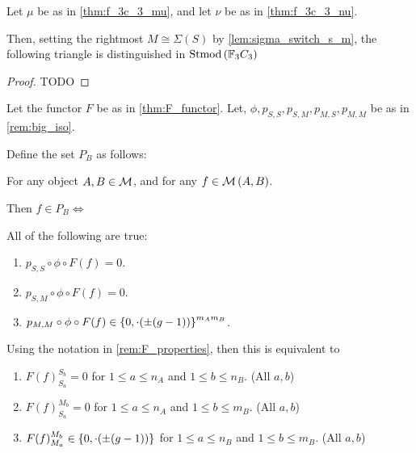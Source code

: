 \begin{lemma} \label{lem:s_m_s_distinguished}
    Let \( \mu \) be as in \autoref{thm:f_3c_3_mu}, and let \( \nu \) be as in \autoref{thm:f_3c_3_nu}.

    Then, setting the rightmost \( M \cong \Sigma(S) \) by \autoref{lem:sigma_switch_s_m}, the following triangle is distinguished in \( \operatorname{Stmod}\left(  {\mathbb{F}}_3C_3  \right) \)
    \begin{center}
    \end{center}
\end{lemma}
\begin{proof}
    TODO
\end{proof}

\begin{definition} \label{def:unholy} %
    Let the functor \( F \) be as in \autoref{thm:F_functor}.  Let, \( \phi, p_{S, S}, p_{S, M}, p_{M, S}, p_{M, M} \) be as in \autoref{rem:big_iso}.

    Define the set \( P_B \) as follows:

    For any object \( A, B \in {\mathcal{M}} \), and for any \( f \in {\mathcal{M}}\left( A, B \right) \).

    Then \( f \in P_B \iff \)

    All of the following are true:
    \begin{enumerate}
        \item {
            \( p_{S, S} \circ \phi \circ F(f) = 0 \).
        }
        \item {
            \( p_{S, M} \circ \phi \circ F(f) = 0 \).
        }
        \item {
            \( p_{M, M} \circ \phi \circ F(f) \in \left\{ 0, \cdot(\pm (g - 1)) \right\}^{m_A m_B} \).
        }
    \end{enumerate}

    Using the notation in \autoref{rem:F_properties}, then this is equivalent to
    \begin{enumerate}
        \item \( F(f)_{S_a}^{S_b} = 0 \) for \( 1 \leq a \leq n_A \) and \( 1 \leq b \leq n_B \). (All \(a, b\))
        \item \( F(f)_{S_a}^{M_b} = 0 \) for \( 1 \leq a \leq n_A \) and \( 1 \leq b \leq m_B \). (All \(a, b\))
        \item \( F(f)_{M_a}^{M_b} \in \left\{ 0, \cdot(\pm (g - 1)) \right\} \) for \( 1 \leq a \leq n_B \) and \( 1 \leq b \leq m_B \). (All \(a, b\))
    \end{enumerate}
\end{definition}

